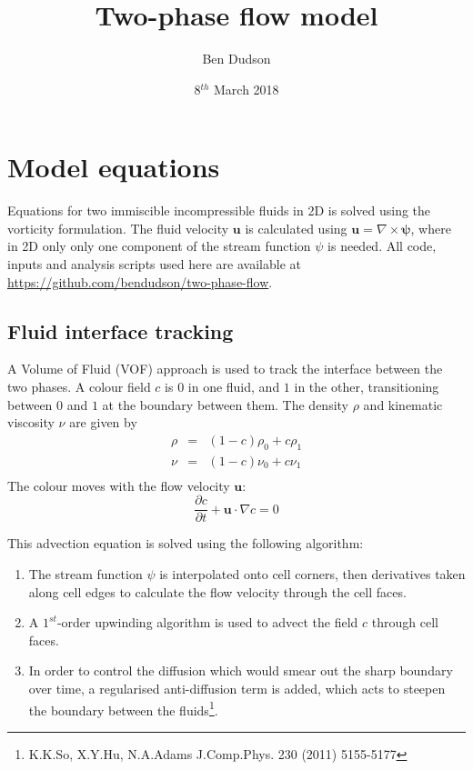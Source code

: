 \documentclass[12pt,a4paper]{article}
\title{ Two-phase flow model }%
\author{ Ben Dudson }%
\date{ 8$^{th}$ March 2018 }%
\begin{document}
\maketitle %
\thispagestyle{fancy}%

\section{Model equations}

Equations for two immiscible incompressible fluids in 2D is solved using the vorticity formulation. The fluid velocity $\mathbf{u}$ is calculated using $\mathbf{u} = \nabla\times\mathbf{\psi}$, where in 2D only only one component of the stream function $\psi$ is needed. All code, inputs and analysis scripts used here are available at \url{https://github.com/bendudson/two-phase-flow}.

\subsection{Fluid interface tracking}

A Volume of Fluid (VOF) approach is used to track the interface between the two phases. A colour field $c$ is $0$ in one fluid, and $1$ in the other, transitioning between $0$ and $1$ at the boundary between them. The density $\rho$ and kinematic viscosity $\nu$ are given by
\begin{eqnarray}
\rho &=& \left(1-c\right)\rho_0 + c \rho_1 \\
\nu &=& \left(1-c\right)\nu_0 + c \nu_1 \\
\end{eqnarray}
The colour moves with the flow velocity $\mathbf{u}$:
\begin{equation}
\frac{\partial c}{\partial t} + \mathbf{u}\cdot\nabla c = 0
\end{equation}

This advection equation is solved using the following algorithm:
\begin{enumerate}
\item The stream function $\psi$ is interpolated onto cell corners, then derivatives taken along cell edges to calculate the flow
velocity through the cell faces.
\item A $1^{st}$-order upwinding algorithm is used to advect
  the field $c$ through cell faces.
\item In order to control the diffusion which would smear out
  the sharp boundary over time, a regularised anti-diffusion
  term is added, which acts to steepen the boundary between the
  fluids\footnote{K.K.So, X.Y.Hu, N.A.Adams J.Comp.Phys. 230 (2011) 5155-5177}. 
\end{enumerate}
\end{document}
